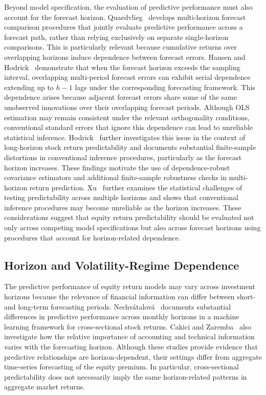 \documentclass[runningheads,orivec]{llncs}
\begin{document}
Beyond model specification, the evaluation of predictive performance must also account for the forecast horizon. Quaedvlieg~\cite{quaedvlieg2021} develops multi-horizon forecast comparison procedures that jointly evaluate predictive performance across a forecast path, rather than relying exclusively on separate single-horizon comparisons. This is particularly relevant because cumulative returns over overlapping horizons induce dependence between forecast errors. Hansen and Hodrick~\cite{hansen1980} demonstrate that when the forecast horizon exceeds the sampling interval, overlapping multi-period forecast errors can exhibit serial dependence extending up to $h-1$ lags under the corresponding forecasting framework. This dependence arises because adjacent forecast errors share some of the same unobserved innovations over their overlapping forecast periods. Although OLS estimation may remain consistent under the relevant orthogonality conditions, conventional standard errors that ignore this dependence can lead to unreliable statistical inference. Hodrick~\cite{hodrick1992} further investigates this issue in the context of long-horizon stock return predictability and documents substantial finite-sample distortions in conventional inference procedures, particularly as the forecast horizon increases. These findings motivate the use of dependence-robust covariance estimators and additional finite-sample robustness checks in multi-horizon return prediction. Xu~\cite{xu2020} further examines the statistical challenges of testing predictability across multiple horizons and shows that conventional inference procedures may become unreliable as the horizon increases. These considerations suggest that equity return predictability should be evaluated not only across competing model specifications but also across forecast horizons using procedures that account for horizon-related dependence.

\subsection{Horizon and Volatility-Regime Dependence}

The predictive performance of equity return models may vary across investment horizons because the relevance of financial information can differ between short- and long-term forecasting periods. Nechv{\'a}talov{\'a}~\cite{nechvatalova2024} documents substantial differences in predictive performance across monthly horizons in a machine learning framework for cross-sectional stock returns. Cakici and Zaremba~\cite{cakici2025} also investigate how the relative importance of accounting and technical information varies with the forecasting horizon. Although these studies provide evidence that predictive relationships are horizon-dependent, their settings differ from aggregate time-series forecasting of the equity premium. In particular, cross-sectional predictability does not necessarily imply the same horizon-related patterns in aggregate market returns.
\end{document}
